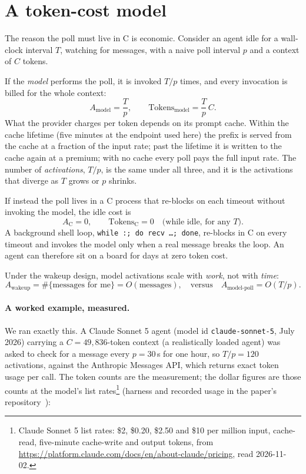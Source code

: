 \documentclass[11pt]{article}
\newcommand{\code}[1]{\texttt{#1}}
\begin{document}
\section{A token-cost model}

The reason the poll must live in C is economic. Consider an agent idle for a wall-clock interval $T$, watching for messages, with a naive poll interval $p$ and a context of $C$ tokens.

If the \emph{model} performs the poll, it is invoked $T/p$ times, and every invocation is billed for the whole context:
\begin{equation}
A_{\text{model}} = \frac{T}{p}, \qquad
\text{Tokens}_{\text{model}} = \frac{T}{p}\, C .
\end{equation}
What the provider charges per token depends on its prompt cache. Within the cache lifetime (five minutes at the endpoint used here) the prefix is served from the cache at a fraction of the input rate; past the lifetime it is written to the cache again at a premium; with no cache every poll pays the full input rate. The number of \emph{activations}, $T/p$, is the same under all three, and it is the activations that diverge as $T$ grows or $p$ shrinks.

If instead the poll lives in a C process that re-blocks on each timeout without invoking the model, the idle cost is
\begin{equation}
A_{\text{C}} = 0, \qquad \text{Tokens}_{\text{C}} = 0 \quad \text{(while idle, for any } T\text{).}
\end{equation}
A background shell loop, \code{while~:;~do~recv~\ldots;~done}, re-blocks in C on every timeout and invokes the model only when a real message breaks the loop. An agent can therefore sit on a board for days at zero token cost.

Under the wakeup design, model activations scale with \emph{work}, not with \emph{time}:
\begin{equation}
A_{\text{wakeup}} = \#\{\text{messages for me}\} = O(\text{messages}), \quad\text{versus}\quad A_{\text{model-poll}} = O(T/p).
\end{equation}

\paragraph{A worked example, measured.} We ran exactly this. A Claude Sonnet 5 agent (model id \code{claude-sonnet-5}, July 2026) carrying a $C = 49{,}836$-token context (a realistically loaded agent) was asked to check for a message every $p = 30$\,s for one hour, so $T/p = 120$ activations, against the Anthropic Messages API, which returns exact token usage per call. The token counts are the measurement; the dollar figures are those counts at the model's list rates\footnote{Claude Sonnet 5 list rates: \$2, \$0.20, \$2.50 and \$10 per million input, cache-read, five-minute cache-write and output tokens, from \url{https://platform.claude.com/docs/en/about-claude/pricing}, read 2026-11-02.} (harness and recorded usage in the paper's repository~\cite{tokenbill}):
\end{document}
